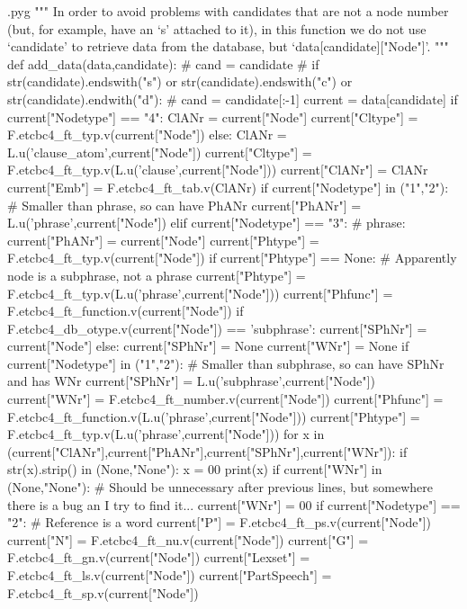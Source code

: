\documentclass{report}
\makeatletter
\newenvironment{python}{%
  \VerbatimEnvironment
  \minted@resetoptions
  \setkeys{minted@opt}{}
      \begin{VerbatimOut}{\jobname.pyg}}
{%
      \end{VerbatimOut}
      \minted@pygmentize{python}
      \DeleteFile{\jobname.pyg}}
\makeatother
\begin{document}
\begin{python}
""" In order to avoid problems with candidates that are not a node number 
    (but, for example, have an `s' attached to it), in this function we
    do not use `candidate' to retrieve data from the database, but
    `data[candidate]["Node"]'.
"""
def add_data(data,candidate):
#    cand = candidate
#    if str(candidate).endswith("s") or str(candidate).endswith("c") or str(candidate).endwith("d"):
#        cand = candidate[:-1]
    current = data[candidate]
    if current["Nodetype"] == "4":
        ClANr = current["Node"]
        current["Cltype"] = F.etcbc4_ft_typ.v(current["Node"])
    else:
        ClANr = L.u('clause_atom',current["Node"])
        current["Cltype"] = F.etcbc4_ft_typ.v(L.u('clause',current["Node"]))
    current["ClANr"] = ClANr
    current["Emb"] = F.etcbc4_ft_tab.v(ClANr)
    if current["Nodetype"] in ("1","2"): # Smaller than phrase, so can have PhANr
        current["PhANr"] = L.u('phrase',current["Node"])
    elif current["Nodetype"] == "3": # phrase:
        current["PhANr"] = current["Node"]
        current["Phtype"] = F.etcbc4_ft_typ.v(current["Node"])
        if current["Phtype"] == None: # Apparently node is a subphrase, not a phrase
            current["Phtype"] = F.etcbc4_ft_typ.v(L.u('phrase',current["Node"]))
        current["Phfunc"] = F.etcbc4_ft_function.v(current["Node"])
        if F.etcbc4_db_otype.v(current["Node"]) == 'subphrase':
            current["SPhNr"] = current["Node"]
        else:
            current["SPhNr"] = None
        current["WNr"] = None
    if current["Nodetype"] in ("1","2"): # Smaller than subphrase, so can have SPhNr and has WNr
        current["SPhNr"] = L.u('subphrase',current["Node"])
        current["WNr"] = F.etcbc4_ft_number.v(current["Node"])
        current["Phfunc"] = F.etcbc4_ft_function.v(L.u('phrase',current["Node"]))
        current["Phtype"] = F.etcbc4_ft_typ.v(L.u('phrase',current["Node"]))
    for x in (current["ClANr"],current["PhANr"],current["SPhNr"],current["WNr"]):
        if str(x).strip() in (None,"None"):
            x = 00 
            print(x)
    if current["WNr"] in (None,"None"): # Should be unnecessary after previous lines, but somewhere there is a bug an I try to find it...
        current["WNr"] = 00
    if current["Nodetype"] == "2": # Reference is a word
        current["P"] = F.etcbc4_ft_ps.v(current["Node"])
        current["N"] = F.etcbc4_ft_nu.v(current["Node"])
        current["G"] = F.etcbc4_ft_gn.v(current["Node"])
        current["Lexset"] = F.etcbc4_ft_ls.v(current["Node"])
        current["PartSpeech"] = F.etcbc4_ft_sp.v(current["Node"])

\end{python}
\end{document}
